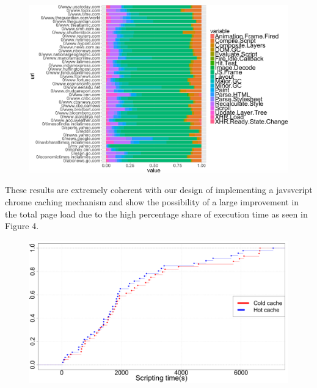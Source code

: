 \begin{figure}[t!]
\centering
\includegraphics[width=0.9\columnwidth]{figs/comp_2.png}
\label{fig:cat_p2}
\end{figure}


These results are extremely coherent with our design of implementing a javsvcript chrome
caching mechanism and show the possibility of a large improvement in the total page
load due to the high percentage share of execution time as seen in Figure 4. 

\begin{figure}[t]
\centering
\includegraphics[width=0.9\columnwidth]{figs/chrome_script.png}
\label{fig:scripting_p2}
\end{figure}

